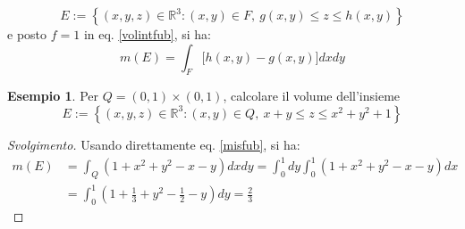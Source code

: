 \documentclass[11pt, a4paper]{scrartcl}
\newenvironment{svolgimento}{\renewcommand\qedsymbol{$\blacksquare$}\begin{proof}[Svolgimento]}{\end{proof}}
\theoremstyle{definition}
\newtheorem{esempio}{Esempio}
\numberwithin{esempio}{section}
\theoremstyle{definition}
\numberwithin{obs}{section}
\numberwithin{nota}{section}
\numberwithin{equation}{subsection}
\begin{document}
\[
E := \left\{ (x,y,z) \in \mathbb{R}^3 : (x,y) \in F, \ g(x,y) \le z \le h(x,y) \right\} 
\] 
e posto $f=1$ in eq. \ref{volintfub}, si ha:
\begin{equation}\label{misfub}
	m(E) = \int_{F} \big[h(x,y) - g(x,y)\big] dxdy
\end{equation}
\begin{esempio}
Per $Q = (0,1) \times (0,1)$, calcolare il volume dell'insieme
\[
	E := \left\{ (x,y,z) \in \mathbb{R}^3 : (x,y) \in Q, \ x+y \le z \le  x^2 + y^2 + 1 \right\} 
\] 
\begin{svolgimento}
	Usando direttamente eq. \ref{misfub}, si ha:
	\[
		\begin{split}
			m(E) &= \int_{Q} (1+x^2 + y^2 - x - y) dxdy = \int_{0} ^1 dy \int_{0} ^1 (1+x^2 + y^2 -x - y) dx \\
			     &= \int_{0} ^1 \left(1+ \frac{1}{3}  + y^2 - \frac{1}{2} - y\right) dy = \frac{2}{3}
		\end{split}
	\] 
	
\end{svolgimento}
\end{esempio}
\end{document}
